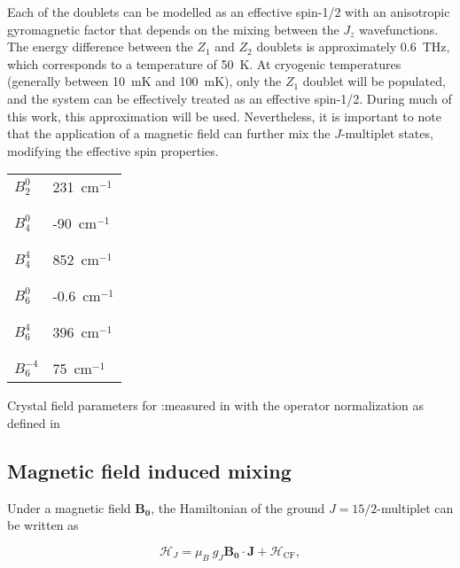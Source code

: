 Each of the doublets can be modelled as an effective spin-1/2 with an anisotropic gyromagnetic factor that depends on the mixing between the $J_z$ wavefunctions. The energy difference between the $Z_1$ and $Z_2$ doublets is approximately 0.6~THz, which corresponds to a temperature of 50~K. At cryogenic temperatures (generally between 10~mK and 100~mK), only the $Z_1$ doublet will be populated, and the system can be effectively treated as an effective spin-1/2. During much of this work, this approximation will be used. Nevertheless, it is important to note that the application of a magnetic field can further mix the $J$-multiplet states, modifying the effective spin properties.

\begin{margintable}
\centering
\begin{tabular}{l|l}
$B_2^0$    & 231~cm$^{-1}$  \\[-1em] \\ \hline \\[-1em]
$B_4^0$    & -90~cm$^{-1}$  \\[-1em] \\ \hline \\[-1em]
$B_4^4$    & 852~cm$^{-1}$  \\[-1em] \\ \hline \\[-1em]
$B_6^0$    & -0.6~cm$^{-1}$ \\[-1em] \\ \hline \\[-1em]
$B_6^4$    & 396~cm$^{-1}$  \\[-1em] \\ \hline \\[-1em]
$B_6^{-4}$ & 75~cm$^{-1}$  
\end{tabular}
\caption{Crystal field parameters for \Er:\Ca measured in \cite{enrique_optical_1971} with the operator normalization as defined in \cite{erath_crystal_1961}}
\label{tab:cf_parameters}
\end{margintable}

\subsection{Magnetic field induced mixing}

Under a magnetic field $\mathbf{B_0}$, the Hamiltonian of the ground $J=15/2$-multiplet can be written as 

\begin{equation}
    \label{eq:J-CF_Hamiltonian}
    \mathcal{H}_J = \mu_B \ g_J\mathbf{B_0}\cdot \mathbf{J} + \mathcal{H}_{\mathrm{CF}},
\end{equation}

